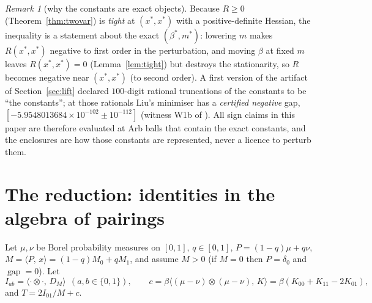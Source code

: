 \documentclass[11pt]{article}
\theoremstyle{plain}
\theoremstyle{definition}
\theoremstyle{remark}
\newtheorem{remark}[theorem]{Remark}
\newcommand{\pr}[2]{\langle #1,\,#2\rangle}
\newcommand{\gap}{\operatorname{gap}}
\begin{document}
\begin{remark}[why the constants are exact objects]\label{rem:exact}
Because $R\ge0$ (Theorem~\ref{thm:twovar}) is \emph{tight} at
$(x^\ast,x^\ast)$ with a positive-definite Hessian, the inequality is a
statement about the exact $(\beta^\ast,m^\ast)$: lowering $m$ makes
$R(x^\ast,x^\ast)$ negative to first order in the perturbation, and moving
$\beta$ at fixed $m$ leaves $R(x^\ast,x^\ast)=0$ (Lemma~\ref{lem:tight}) but
destroys the stationarity, so $R$ becomes negative near $(x^\ast,x^\ast)$
(to second order).  A
first version of the artifact of Section~\ref{sec:lift} declared $100$-digit
rational truncations of the constants to be ``the constants''; at those
rationals Liu's minimiser has a \emph{certified negative} gap,
$[-5.9548013684\times10^{-102}\pm10^{-112}]$ (witness W1b of
).  All sign claims in this paper are
therefore evaluated at Arb balls that contain the exact constants, and the
enclosures are how those constants are represented, never a licence to
perturb them.
\end{remark}

\section{The reduction: identities in the algebra of pairings}\label{sec:reduction}

Let $\mu,\nu$ be Borel probability measures on $[0,1]$, $q\in[0,1]$,
$P=(1-q)\mu+q\nu$, $M=\pr{P}{x}=(1-q)M_0+qM_1$, and assume $M>0$ (if $M=0$
then $P=\delta_0$ and $\gap=0$).  Let
\[
  I_{ab}=\pr{\cdot\otimes\cdot}{D_M}\ \ (a,b\in\{0,1\}),\qquad
  c=\beta\pr{(\mu-\nu)\otimes(\mu-\nu)}{K}=\beta(K_{00}+K_{11}-2K_{01}),
\]
and $T=2I_{01}/M+c$.
\end{document}
